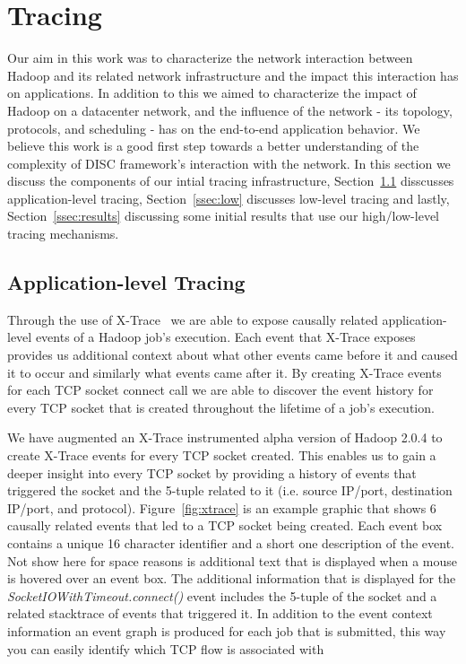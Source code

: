 \section{Tracing}
\label{sec:tracing}
Our aim in this work was to characterize the network interaction 
between Hadoop and its related network infrastructure and the impact this 
interaction has on applications. In addition to this we aimed to 
characterize the impact of Hadoop on a datacenter network, and the 
influence of the network - its topology, protocols, and scheduling - has on the 
end-to-end application behavior. We believe this work is a good first step 
towards a better understanding of the complexity of DISC framework's interaction
with the network. In this section we discuss the components of our intial tracing
infrastructure, Section~\ref{ssec:app} disscusses application-level tracing, 
Section~\ref{ssec:low} discusses low-level tracing and lastly, 
Section~\ref{ssec:results} discussing some initial results that use our high/low-level
tracing mechanisms.

\subsection{Application-level Tracing}
\label{ssec:app}
Through the use of X-Trace~\cite{xtrace} we are able to expose causally related 
application-level events of a Hadoop job's execution. Each event that X-Trace
exposes provides us additional context about what other events came before it and
caused it to occur and similarly what events came after it. By creating X-Trace 
events for each TCP socket connect call we are able to discover the event history
for every TCP socket that is created throughout the lifetime of a job's execution.

We have augmented an X-Trace instrumented alpha version of Hadoop 2.0.4 to create 
X-Trace events for every TCP socket created. This enables us to gain a deeper insight
into every TCP socket by providing a history of events that triggered the socket and
the 5-tuple related to it (i.e. source IP/port, destination IP/port, and protocol).
Figure~\ref{fig:xtrace} is an example graphic that shows 6 causally related events that
led to a TCP socket being created. Each event box contains a unique 16 character 
identifier and a short one description of the event. Not show here for space reasons is
additional text that is displayed when a mouse is hovered over an event box. The additional
information that is displayed for the {\em SocketIOWithTimeout.connect()} event includes
the 5-tuple of the socket and a related stacktrace of events that triggered it. In addition
to the event context information an event graph is produced for each job that is submitted,
this way you can easily identify which TCP flow is associated with 

